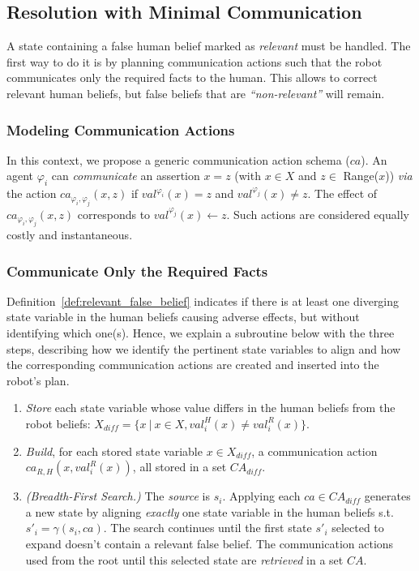 {    \subsection{Resolution with Minimal Communication}

A state containing a false human belief marked as \textit{relevant} must be handled. 
The first way to do it is by planning communication actions such that the robot communicates only the required facts to the human. This allows to correct relevant human beliefs, but false beliefs that are \textit{``non-relevant''} will remain. 

\subsubsection{Modeling Communication Actions} 
In this context, we propose a generic communication action schema ($ca$). 
An agent $\varphi_i$ can \textit{communicate} an assertion $x=z$ (with $x \in X$ and $z \in$ Range($x$)) \textit{via} the action $ca_{\varphi_i, \varphi_j}(x,z)$ if $val^{\varphi_i}(x) = z$ and $val^{\varphi_j}(x) \neq z$.
The effect of $ca_{\varphi_i, \varphi_j}(x,z)$ corresponds to $val^{\varphi_j}(x) \leftarrow z$. Such actions are considered equally costly and instantaneous.

\subsubsection{Communicate Only the Required Facts}
Definition~\ref{def:relevant_false_belief} indicates if there is at least one diverging state variable in the human beliefs causing adverse effects, but without identifying which one(s).
Hence, we explain a subroutine below with the three steps, describing how we identify the pertinent state variables to align and how the corresponding communication actions are created and inserted into the robot's plan.

\begin{enumerate}
    \item 
    \textit{Store} each state variable whose value differs in the human beliefs from the robot beliefs: $X_{diff} = \{ x ~|~ x\in X, val^H_i(x) \neq val^R_i(x) \}$.

    \item
    \textit{Build}, for each stored state variable $x \in X_{diff}$, a communication action $ca_{R, H}(x,val^R_i(x))$, all stored in a set $\mathit{CA}_{diff}$.

    \item 
    \textit{(Breadth-First Search.)} 
    The \textit{source} is $s_i$. Applying each $ca \in \mathit{CA}_{diff}$ generates a new state by aligning \textit{exactly} one state variable in the human beliefs s.t. $s'_i = \gamma(s_i, ca )$. 
    The search continues until the first state $s'_i$ selected to expand doesn't contain a relevant false belief. The communication actions used from the root until this selected state are \textit{retrieved} in a set $\mathit{CA}$.
\end{enumerate}

}
